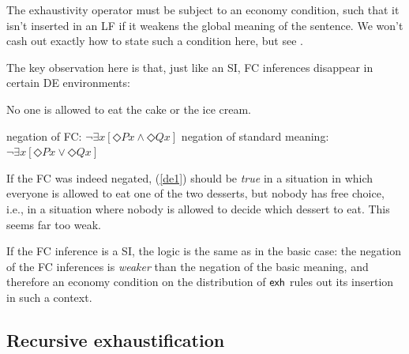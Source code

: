 \documentclass[landscape,cronos,paper=letter]{ling-handout}
\begin{document}
The exhaustivity operator must be subject to an economy condition, such that it isn't inserted in an LF if it weakens the global meaning of the sentence. We won't cash out exactly how to state such a condition here, but see \citet{fox_economy_2018}.

The key observation here is that, just like an SI, FC inferences disappear in certain DE environments:

\ex\label{de1}
No one is allowed to eat the cake or the ice cream.
\xe

\pex
\a\ljudge{*} negation of FC: $¬ ∃ x[◇ P x ∧ ◇ Q x]$
\a negation of standard meaning: $¬ ∃ x[◇ P x ∨ ◇ Q x]$
\xe

If the FC was indeed negated, (\ref{de1}) should be \textit{true} in a situation in which everyone is allowed to eat one of the two desserts, but nobody has free choice, i.e., in a situation where nobody is allowed to decide which dessert to eat. This seems far too weak.

If the FC inference is a SI, the logic is the same as in the basic case: the negation of the FC inferences is \textit{weaker} than the negation of the basic meaning, and therefore an economy condition on the distribution of $\textsf{exh}$ rules out its insertion in such a context.

\subsection{Recursive exhaustification}
\end{document}
